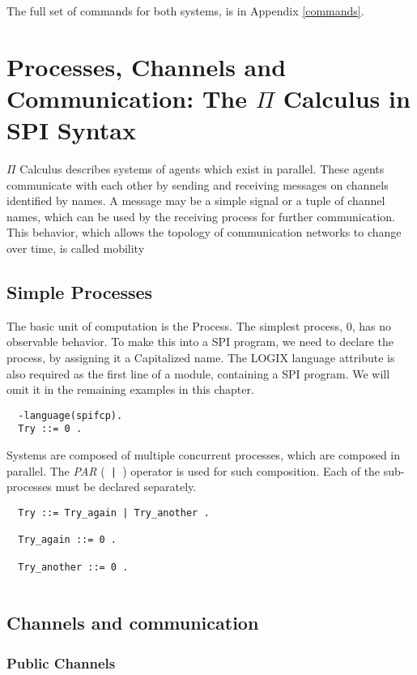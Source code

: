 The full set of commands for both systems, is in
Appendix \ref{commands}.

\chapter{Processes, Channels and Communication: The $\Pi$ Calculus in
SPI Syntax}
\label{syntax}

$\Pi$ Calculus describes systems of agents which exist in
parallel. These agents communicate with each other by sending and
receiving messages on channels identified by names. A message may
be a simple signal or a tuple of channel names, which can be used by the
receiving process for further communication. This behavior, which
allows the topology of communication networks to change over time, is
called mobility

\section{Simple Processes}

The basic unit of computation is the Process. The simplest process, 0,
has no observable behavior. To make this into a SPI program, we need
to declare the process, by assigning it a Capitalized name. The LOGIX
language attribute is also required as the first line of a module,
containing a SPI program. We
will omit it in the remaining examples in this chapter.

\begin{verbatim}
  -language(spifcp).
  Try ::= 0 .

\end{verbatim}

Systems are composed of multiple concurrent processes, which are
composed in parallel. The {\em PAR} (\verb+ | +) operator is used for such
composition. Each of the sub-processes must be declared separately.

\begin{verbatim}
  Try ::= Try_again | Try_another .

  Try_again ::= 0 .

  Try_another ::= 0 .
 
\end{verbatim}

\section{Channels and communication}

\subsection{Public Channels}

